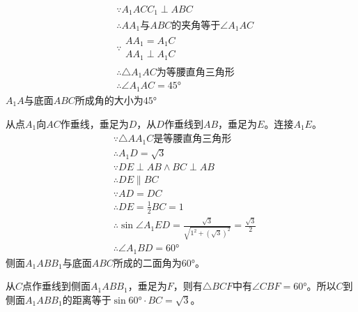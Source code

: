 \documentclass[answers]{exam}
\begin{document}
\begin{questions}
\begin{figure*}[ht]
	\end{figure*}

	\begin{solution}
		\begin{penum}
			\item
			\begin{align*}
				 & \because A_1ACC_1 \perp ABC                               \\
				 & \therefore AA_1\text{与}ABC\text{的夹角等于}\angle{A_1AC} \\
				 & \because
				\begin{array}{l}
					AA_1 = A_1C \\
					AA_1 \perp A_1C
				\end{array}                                              \\
				 & \therefore \triangle{A_1AC}\text{为等腰直角三角形}        \\
				 & \therefore \angle{A_1AC} = \ang{45}
			\end{align*}
			$A_1A$与底面$ABC$所成角的大小为$\ang{45}$
			\item 从点$A_1$向$AC$作垂线，垂足为$D$，从$D$作垂线到$AB$，垂足为$E$。连接$A_1E$。
			\begin{align*}
				 & \because \triangle{AA_1C}\text{是等腰直角三角形}                                               \\
				 & \therefore A_1D = \sqrt{3}                                                                     \\
				 & \because DE \perp AB \land BC \perp AB                                                         \\
				 & \therefore DE \parallel BC                                                                     \\
				 & \because AD = DC                                                                               \\
				 & \therefore DE = \frac12BC = 1                                                                  \\
				 & \therefore \sin\angle{A_1ED} = \frac{\sqrt{3}}{\sqrt{1^2 + (\sqrt{3})^2}} = \frac{\sqrt{3}}{2} \\
				 & \therefore \angle{A_1BD} = \ang{60}
			\end{align*}
			侧面$A_1ABB_1$与底面$ABC$所成的二面角为$\ang{60}$。
			\item
			从$C$点作垂线到侧面$A_1ABB_1$，垂足为$F$，则有$\triangle{BCF}$中有$\angle{CBF}=\ang{60}$。所以$C$到侧面$A_1ABB_1$的距离等于$\sin{\ang{60}} \cdot BC = \sqrt{3}$。
		\end{penum}
	\end{solution}
\end{questions}
\end{document}
